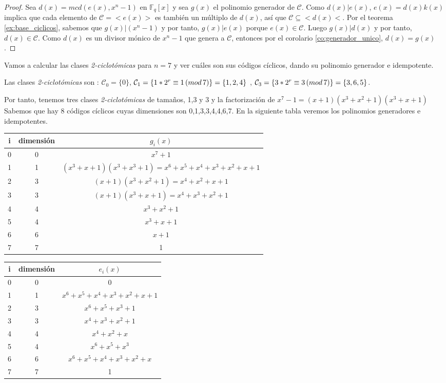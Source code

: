 \begin{proof}
Sea $d(x) = mcd(e(x),x^n-1)$ en $\mathbb{F}_q[x]$ y sea $g(x)$ el polinomio generador de $\mathcal{C}$. Como $d(x) | e(x)$, $e(x) = d(x)k(x)$ implica que cada elemento de $\mathcal{C} = < e(x) > $ es también un múltiplo de $d(x)$, así que $\mathcal{C} \subseteq <d(x)<$. Por el teorema \ref{ex:base_ciclicos}, sabemos que $g(x) | (x^n-1)$ y por tanto, $g(x) | e(x)$ porque $e(x) \in \mathcal{C}$. Luego $g(x) | d(x)$ y por tanto, $d(x) \in \mathcal{C}$. Como $d(x)$ es un divisor mónico de $x^n-1$ que genera a $\mathcal{C}$, entonces por el corolario \ref{co:generador_unico}, $d(x) = g(x)$.
\end{proof}

\begin{exampleth}
\label{ex:idempotente_siete}
Vamos a calcular las clases \textit{2-ciclotómicas} para $n=7$ y ver cuáles son sus códigos cíclicos, dando su polinomio generador e idempotente.

Las clases \textit{2-ciclotómicas} son : $\mathcal{C}_0 = \{ 0 \} $, $\mathcal{C}_1 = \{ 1*2^r \equiv 1 \thinspace (mod \thinspace 7) \} = \{ 1,2,4 \} $ , $\mathcal{C}_3 = \{ 3*2^r \equiv 3 \thinspace (mod \thinspace 7) \} = \{ 3,6,5 \} $. 

Por tanto, tenemos tres clases \textit{2-ciclotómicas} de tamaños, 1,3 y 3 y la factorización de $x^7-1 = (x+1)(x^3+x^2+1)(x^3+x+1)$ Sabemos que hay 8 códigos cíclicos cuyas dimensiones son 0,1,3,3,4,4,6,7. En la siguiente tabla veremos los polinomios generadores e idempotentes.

 \begin{tabular}{ c | c | c | }
	i & dimensión & $g_i(x)$ \\ \hline
	0 & 0 & $ x^7 + 1$  \\
	1 & 1 & $ (x^3+x+1)(x^3+x^3+1) = x^6+x^5+x^4+x^3+x^2+x+1$  \\ 
	2 & 3 & $ (x+1)(x^3+x^2+1) = x^4+x^2+x+1$ \\
	3 & 3 & $ (x+1)(x^3+x+1) = x^4+x^3+x^2+1$  \\
	4 & 4 & $ x^3+x^2+1$  \\
	5 & 4 & $ x^3+x+1$ \\
	6 & 6 & $x+1$  \\ 
	7 & 7 & 1 

	\end{tabular}
	
	\begin{tabular}{ c | c | c |}
	i & dimensión & $e_i(x)$\\ \hline
	0 & 0  & 0 \\
	1 & 1 & $x^6+x^5+x^4+x^3+x^2+x+1$ \\ 
	2 & 3  & $x^6+x^5+x^3+1$\\
	3 & 3  &  $x^4+x^3+x^2+1$ \\
	4 & 4  & $x^4+x^2+x$ \\
	5 & 4  & $x^6+x^5+x^3$\\
	6 & 6  & $x^6+x^5+x^4+x^3+x^2+x$ \\ 
	7 & 7  & 1


\end{tabular}
\end{exampleth}
